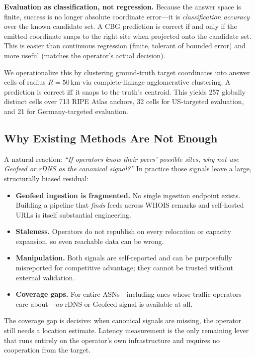 \textbf{Evaluation as classification, not regression.} Because the answer space is finite,
success is no longer absolute coordinate error---it is \emph{classification accuracy} over the
known candidate set. A CBG prediction is correct if and only if the emitted coordinate snaps to
the right site when projected onto the candidate set. This is easier than continuous regression
(finite, tolerant of bounded error) and more useful (matches the operator's actual decision).

We operationalize this by clustering ground-truth target coordinates into answer cells of radius
$R = 50$\,km via complete-linkage agglomerative clustering. A prediction is correct iff it snaps
to the truth's centroid. This yields 257 globally distinct cells over 713 RIPE Atlas anchors,
32 cells for US-targeted evaluation, and 21 for Germany-targeted evaluation.

\subsection{Why Existing Methods Are Not Enough}
\label{sec:intro-challenges}

A natural reaction: \emph{``If operators know their peers' possible sites, why not use Geofeed
or rDNS as the canonical signal?''} In practice those signals leave a large, structurally biased
residual:

\begin{itemize}[leftmargin=*]
  \item \textbf{Geofeed ingestion is fragmented.} No single ingestion endpoint exists. Building a
    pipeline that \emph{finds} feeds across WHOIS remarks and self-hosted URLs is itself substantial
    engineering.
  \item \textbf{Staleness.} Operators do not republish on every relocation or capacity expansion,
    so even reachable data can be wrong.
  \item \textbf{Manipulation.} Both signals are self-reported and can be purposefully misreported
    for competitive advantage; they cannot be trusted without external validation.
  \item \textbf{Coverage gaps.} For entire ASNs---including ones whose traffic operators care
    about---\emph{no} rDNS or Geofeed signal is available at all.
\end{itemize}

The coverage gap is decisive: when canonical signals are missing, the operator still needs a
location estimate. Latency measurement is the only remaining lever that runs entirely on the
operator's own infrastructure and requires no cooperation from the target.

